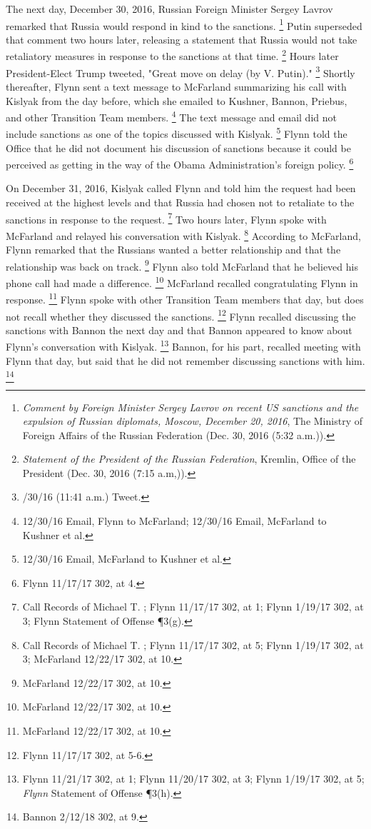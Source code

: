 The next day, December 30, 2016, Russian Foreign Minister Sergey Lavrov remarked that Russia would respond in kind to the sanctions.%
\footnote{\textit{Comment by Foreign Minister Sergey Lavrov on recent US sanctions and the expulsion of Russian diplomats, Moscow, December 20, 2016}, The Ministry of Foreign Affairs of the Russian Federation (Dec. 30, 2016 (5:32 a.m.)).}
Putin superseded that comment two hours later, releasing a statement that Russia would not take retaliatory measures in response to the sanctions at that time.%
\footnote{\textit{Statement of the President of the Russian Federation}, Kremlin, Office of the President (Dec. 30, 2016 (7:15 a.m,)).}
Hours later President-Elect Trump tweeted, "Great move on delay (by V. Putin)."%
\footnote{/30/16 (11:41 a.m.) Tweet.}
Shortly thereafter, Flynn sent a text message to McFarland summarizing his call with Kislyak from the day before, which she emailed to Kushner, Bannon, Priebus, and other Transition Team members.%
\footnote{12/30/16 Email, Flynn to McFarland;
12/30/16 Email, McFarland to Kushner et al.}
The text message and email did not include sanctions as one of the topics discussed with Kislyak.%
\footnote{12/30/16 Email, McFarland to Kushner et al.}
Flynn told the Office that he did not document his discussion of sanctions because it could be perceived as getting in the way of the Obama Administration's foreign policy.%
\footnote{Flynn 11/17/17 302, at 4.}

On December 31, 2016, Kislyak called Flynn and told him the request had been received at the highest levels and that Russia had chosen not to retaliate to the sanctions in response to the request.%
\footnote{Call Records of Michael T. ;
Flynn 11/17/17 302, at 1;
Flynn 1/19/17 302, at 3;
Flynn Statement of Offense \P 3(g).}
Two hours later, Flynn spoke with McFarland and relayed his conversation with Kislyak.%
\footnote{Call Records of Michael T. ;
Flynn 11/17/17 302, at 5;
Flynn 1/19/17 302, at 3;
McFarland 12/22/17 302, at 10.}
According to McFarland, Flynn remarked that the Russians wanted a better relationship and that the relationship was back on track.%
\footnote{McFarland 12/22/17 302, at 10.}
Flynn also told McFarland that he believed his phone call had made a difference.%
\footnote{McFarland 12/22/17 302, at 10.}
McFarland recalled congratulating Flynn in response.%
\footnote{McFarland 12/22/17 302, at 10.}
Flynn spoke with other Transition Team members that day, but does not recall whether they discussed the sanctions.%
\footnote{Flynn 11/17/17 302, at 5-6.}
Flynn recalled discussing the sanctions with Bannon the next day and that Bannon appeared to know about Flynn's conversation with Kislyak.%
\footnote{Flynn 11/21/17 302, at 1;
Flynn 11/20/17 302, at 3;
Flynn 1/19/17 302, at 5;
\textit{Flynn} Statement of Offense \P 3(h).}
Bannon, for his part, recalled meeting with Flynn that day, but said that he did not remember discussing sanctions with him.%
\footnote{Bannon 2/12/18 302, at 9.}

